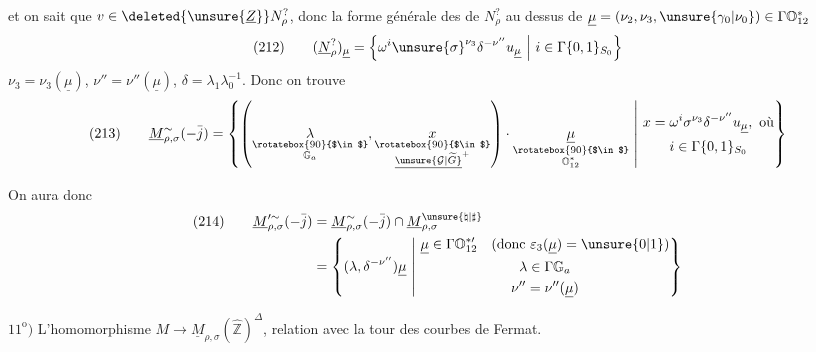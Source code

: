 et on sait que $v\in\deleted{\unsure{\underline Z}}
N_\rho^{?}$, donc la forme
générale des 
de $N_\rho^{?}$ au dessus de
$\underline\mu=(\nu_2,\nu_3,\unsure{\gamma_0|\nu_0})
\in\Gamma\mathbb O_{12}^{*}$
\[
(212)\qquad
(\underline N_\rho^{?})_{\underline\mu}
=\left\{\omega^{i}\unsure{\sigma}^{\nu_3}\delta^{-\nu''}
u_{\underline\mu}\ \middle|\
i\in\Gamma\{0,1\}_{S_0}\right\}
\]
$\nu_3=\nu_3(\underline\mu)$,
$\nu''=\nu''(\underline\mu)$,
$\delta=\lambda_1\lambda_0^{-1}$. Donc on trouve
\[
\begin{aligned}
(213)\qquad
\underline M_{\rho,\sigma}^{\sim}(-\bar j)
=\left\{\left(
\underset{\substack{\rotatebox{90}{$\in$}\\\mathbb G_a}}{\lambda},
\underset{\substack{\rotatebox{90}{$\in$}\\
\underline{\unsure{\mathcal G|\widetilde G}}^{+}}}{x}
\right)\cdot
\underset{\substack{\rotatebox{90}{$\in$}\\
\mathbb O_{12}^{*}}}{\underline\mu}
\ \middle|\
\begin{gathered}
x=\omega^{i}\sigma^{\nu_3}\delta^{-\nu''}u_{\underline\mu},\ \text{où}\\
i\in\Gamma\{0,1\}_{S_0}
\end{gathered}\right\}
\end{aligned}
\]

On aura donc
\[
\begin{aligned}
(214)\qquad
\underline M_{\rho,\sigma}^{\prime\sim}(-\bar j)
&=\underline M_{\rho,\sigma}^{\sim}(-\bar j)\cap
\underline M_{\rho,\sigma}^{\unsure{\natural|\sharp}}\\
&=\left\{(\lambda,\delta^{-\nu''})\underline\mu
\ \middle|\
\begin{gathered}
\underline\mu\in\Gamma\mathbb O_{12}^{*\prime}
\quad(\text{donc }\varepsilon_3(\underline\mu)=\unsure{0|1})\\
\lambda\in\Gamma\mathbb G_a\\
\nu''=\nu''(\underline\mu)
\end{gathered}\right\}
\end{aligned}
\]

$11^{\mathrm o})$ L'homomorphisme
$M\longrightarrow\underline M_{\rho,\sigma}(\widehat{\mathbb Z})^{\Delta}$,
relation avec la tour des courbes de Fermat.


